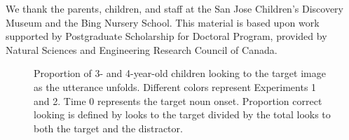 \documentclass[10pt,letterpaper]{article}
\begin{document}
We thank the parents, children, and staff at the San Jose Children's Discovery Museum and the Bing Nursery School. This material is based upon work supported by Postgraduate Scholarship for Doctoral Program, provided by Natural Sciences and Engineering Research Council of Canada.

\begin{figure}[t]
	\caption{\label{fig:pros0} Proportion of 3- and 4-year-old children looking to the target image as the utterance unfolds. Different colors represent Experiments 1 and 2. Time 0 represents the target noun onset. Proportion correct looking is defined by looks to the target divided by the total looks to both the target and the distractor.}
\end{figure}




\setlength{\bibleftmargin}{.125in}
\setlength{\bibindent}{-\bibleftmargin}


\end{document}
